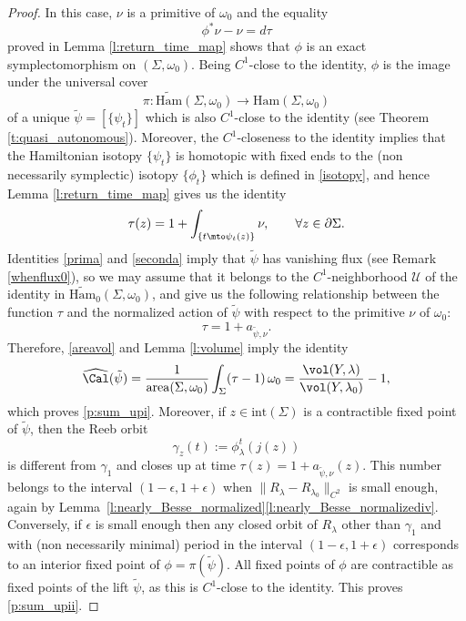 \begin{proof}
In this case, $\nu$ is a primitive of $\omega_0$ and the equality
\begin{equation}
\label{prima}
\phi^* \nu - \nu = d\tau
\end{equation}
proved in Lemma \ref{l:return_time_map} shows that $\phi$ is an exact symplectomorphism on $(\Sigma,\omega_0)$. Being $C^1$-close to the identity, $\phi$ is the image under the universal cover
\[
\pi: \widetilde{\mathrm{Ham}}(\Sigma,\omega_0) \to \mathrm{Ham}(\Sigma,\omega_0)
\]
of a unique $\tilde{\psi}=[\{\psi_t\}]$ which is also $C^1$-close to the identity (see Theorem \ref{t:quasi_autonomous}). Moreover, the $C^1$-closeness to the identity implies that the Hamiltonian isotopy $\{\psi_t\}$ is homotopic with fixed ends to the (non necessarily symplectic) isotopy $\{\phi_t\}$ which is defined in \eqref{isotopy}, and hence Lemma \ref{l:return_time_map} gives us the identity
\begin{equation}
\label{seconda}
\tau(z) = 1 + \int_{\{t\mto \psi_t(z)\}} \nu,\qquad\forall z\in\partial\Sigma.
\end{equation}
Identities \eqref{prima} and \eqref{seconda} imply that $\tilde{\psi}$ has vanishing flux (see Remark \ref{whenflux0}), so we may assume that it belongs to the $C^1$-neighborhood $\mathcal{U}$ of the identity in $\widetilde{\mathrm{Ham}}_0(\Sigma,\omega_0)$, and give us the following relationship between the function $\tau$ and the normalized action of $\tilde{\psi}$ with respect to the primitive $\nu$ of $\omega_0$:
\begin{equation}
\label{tauaction}
\tau = 1 + a_{\tilde{\psi},\nu}.
\end{equation}
Therefore, \eqref{areavol} and Lemma \ref{l:volume} imply the identity
\[
\widehat{\Cal}(\tilde{\psi}) = \frac{1}{\mathrm{area}(\Sigma,\omega_0)} \int_{\Sigma} (\tau - 1)\, \omega_0 = \frac{\vol(Y,\lambda)}{\vol(Y,\lambda_0)}-1,
\]
which proves \eqref{p:sum_upi}. Moreover, if $z\in \mathrm{int}(\Sigma)$ is a contractible fixed point of $\tilde\psi$, then the Reeb orbit
\[
\gamma_z(t):= \phi_{\lambda}^t(j(z))
\]
is different from $\gamma_1$ and closes up at time $\tau(z) = 1 + a_{\tilde{\psi},\nu}(z)$. This number belongs to the interval $(1-\epsilon,1+\epsilon)$ when $\|R_{\lambda} - R_{\lambda_0}\|_{C^2}$ is small enough, again by Lemma~\ref{l:nearly_Besse_normalized}\eqref{l:nearly_Besse_normalizediv}. Conversely, if $\epsilon$ is small enough then any closed orbit of $R_{\lambda}$ other than $\gamma_1$ and with (non necessarily minimal) period in the interval $(1-\epsilon,1+\epsilon)$ corresponds to an interior fixed point of $\phi= \pi(\tilde\psi)$. All fixed points of $\phi$ are contractible as fixed points of the lift $\tilde{\psi}$, as this is $C^1$-close to the identity. This proves \eqref{p:sum_upii}.


\end{proof}
